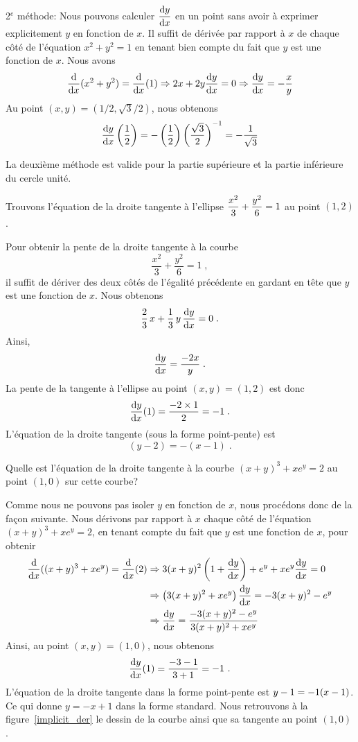 {\begin{egg}
2$^e$ méthode:  Nous pouvons calculer $\DS \dydx{y}{x}$ en un
point sans avoir à exprimer explicitement $y$ en fonction de $x$.
Il suffit de dérivée par rapport à $x$ de chaque côté de
l'équation $x^2 + y^2 = 1$ en tenant bien compte du fait que $y$ est
une fonction de $x$.  Nous avons
\[
\dfdx{(x^2+y^2)}{x} = \dfdx{(1)}{x}
\Rightarrow 2x + 2y \dydx{y}{x} = 0 \\
\Rightarrow \dydx{y}{x} = - \frac{x}{y}
\]
Au point $(x,y) = (1/2, \sqrt{3}/2)$, nous obtenons
\[
\dydx{y}{x}\left(\frac{1}{2}\right) = -\left(\frac{1}{2}\right)
\left( \frac{\sqrt{3}}{2} \right)^{-1} = - \frac{1}{\sqrt{3}}
\]

La deuxième méthode est valide pour la partie
supérieure et la partie inférieure du cercle unité.
\end{egg}


\begin{egg}
Trouvons l'équation de la droite tangente à l'ellipse
$\DS \frac{x^2}{3} + \frac{y^2}{6} = 1$ au point $(1,2)$.

Pour obtenir la pente de la droite tangente à la courbe
\[
\frac{x^2}{3} + \frac{y^2}{6} = 1 \; ,
\]
il suffit de dériver des deux côtés de l'égalité précédente en gardant
en tête que $y$ est une fonction de $x$.  Nous obtenons
\[
\frac{2}{3}\, x + \frac{1}{3} \, y \,\dydx{y}{x} = 0 \; .
\]
Ainsi,
\[
\dydx{y}{x} = \frac{-2x}{y} \; .
\]
La pente de la tangente à l'ellipse au point $(x,y) = (1,2)$ est donc
\[
\dydx{y}{x}(1) = \frac{-2\times 1}{2} = -1 \; .
\]
L'équation de la droite tangente (sous la forme point-pente) est
\[
(y-2) = -(x-1) \; .
\]
\end{egg}

\begin{egg}
Quelle est l'équation de la droite tangente à la courbe
$(x+y)^3 + x e^y = 2$ au point $(1,0)$ sur cette courbe?

Comme nous ne pouvons pas isoler $y$ en fonction de $x$, nous
procédons donc de la façon suivante.  Nous dérivons par rapport à $x$
chaque côté de l'équation $(x+y)^3 + x e^y = 2$, en tenant compte du
fait que $y$ est une fonction de $x$, pour obtenir
\begin{align*}
\dfdx{((x+y)^3 + x e^y)}{x} = \dfdx{(2)}{x}
& \Rightarrow 3(x+y)^2\left(1+\dydx{y}{x}\right)
+ e^y + xe^y \dydx{y}{x} = 0 \\
& \Rightarrow \left( 3(x+y)^2 + xe^y\right) \dydx{y}{x}
= -3(x+y)^2 - e^y \\
& \Rightarrow \dydx{y}{x}
= \frac{-3(x+y)^2 - e^y}{3(x+y)^2 + xe^y}
\end{align*}
Ainsi, au point $(x,y) = (1,0)$, nous obtenons
\[
\dydx{y}{x}(1) = \frac{-3 - 1}{3 + 1} = -1 \ .
\]
L'équation de la droite tangente dans la forme point-pente est
$\DS y -1 = -1 (x-1)$.  Ce qui donne $y = -x + 1$
dans la forme standard.   Nous retrouvons à la
figure~\ref{implicit_der} le dessin de la courbe ainsi que sa tangente
au point $(1,0)$.
\end{egg}

}
